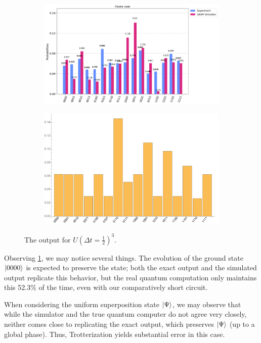 \documentclass[10pt]{amsart}
\theoremstyle{definition}
\begin{document}
\begin{figure}[hbt]
    \begin{subfigure}{0.4\textwidth}
    \centering
    \includegraphics[width=0.9\linewidth]{inputClust_quantum.png}
  \end{subfigure}
  \begin{subfigure}{0.4\textwidth}
    \centering
    \includegraphics[width=0.9\linewidth]{inputClust_exact.pdf}
  \end{subfigure}
  \caption{The output for $U(\Delta t = \frac12)^3$.}
  \label{fig:output}
\end{figure}

\clearpage 

Observing \cref{fig:output}, we may notice several things. The evolution of the
ground state $\ket{0000}$ is expected to preserve the state; both the exact
output and the simulated output replicate this behavior, but the real quantum
computation only maintains this 52.3\% of the time, even with our comparatively
short circuit.

When considering the uniform superposition state $\ket{\Psi}$, we may observe
that while the simulator and the true quantum computer do not agree very
closely, neither comes close to replicating the exact output, which preserves
$\ket{\Psi}$ (up to a global phase). Thus, Trotterization yields substantial
error in this case.
\end{document}
